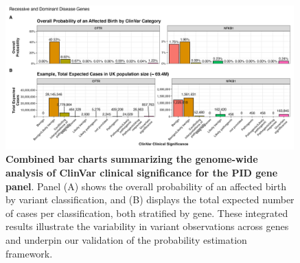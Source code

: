 \begin{figure}[ht]
  \centering
  \includegraphics[width=0.99\textwidth]{../images/all_genes_combined_bar_charts_mini.png}
  \caption{\textbf{Combined bar charts summarizing the genome-wide analysis of ClinVar clinical significance for the PID gene panel}. Panel (A) shows the overall probability of an affected birth by variant classification, and (B) displays the total expected number of cases per classification, both stratified by gene. These integrated results illustrate the variability in variant observations across genes and underpin our validation of the probability estimation framework.}
  \label{fig:all_genes_combined_bar_charts_mini}
\end{figure}

\FloatBarrier

